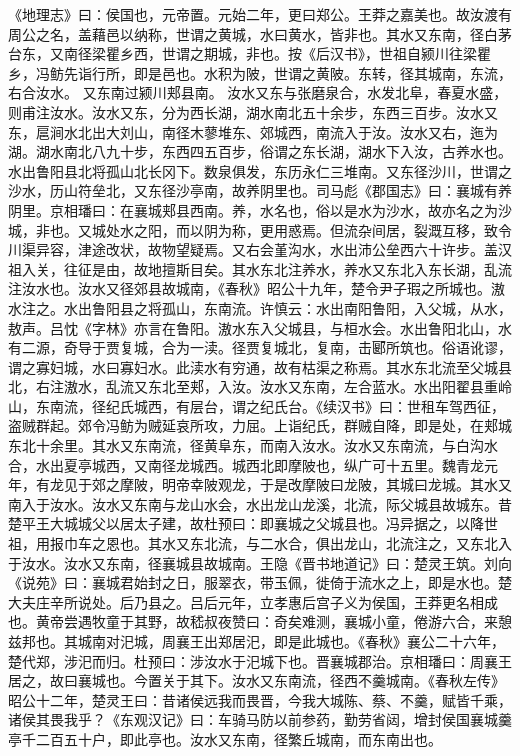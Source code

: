 \documentclass[12pt,UTF8]{ctexbook}
\begin{document}
《地理志》曰：侯国也，元帝置。元始二年，更曰郑公。王莽之嘉美也。故汝渡有周公之名，盖藉邑以纳称，世谓之黄城，水曰黄水，皆非也。其水又东南，径白茅台东，又南径梁瞿乡西，世谓之期城，非也。按《后汉书》，世祖自颍川往梁瞿乡，冯鲂先诣行所，即是邑也。水积为陂，世谓之黄陂。东转，径其城南，东流，右合汝水。
又东南过颍川郏县南。
汝水又东与张磨泉合，水发北阜，春夏水盛，则甫注汝水。汝水又东，分为西长湖，湖水南北五十余步，东西三百步。汝水又东，扈涧水北出大刘山，南径木蓼堆东、郊城西，南流入于汝。汝水又右，迤为湖。湖水南北八九十步，东西四五百步，俗谓之东长湖，湖水下入汝，古养水也。水出鲁阳县北将孤山北长冈下。数泉俱发，东历永仁三堆南。又东径沙川，世谓之沙水，历山符垒北，又东径沙亭南，故养阴里也。司马彪《郡国志》曰：襄城有养阴里。京相璠曰：在襄城郏县西南。养，水名也，俗以是水为沙水，故亦名之为沙城，非也。又城处水之阳，而以阴为称，更用惑焉。但流杂间居，裂溉互移，致令川渠异容，津途改状，故物望疑焉。又右会堇沟水，水出沛公垒西六十许步。盖汉祖入关，往征是由，故地擅斯目矣。其水东北注养水，养水又东北入东长湖，乱流注汝水也。汝水又径郊县故城南，《春秋》昭公十九年，楚令尹子瑕之所城也。滶水注之。水出鲁阳县之将孤山，东南流。许慎云：水出南阳鲁阳，入父城，从水，敖声。吕忱《字林》亦言在鲁阳。滶水东入父城县，与桓水会。水出鲁阳北山，水有二源，奇导于贾复城，合为一渎。径贾复城北，复南，击郾所筑也。俗语讹谬，谓之寡妇城，水曰寡妇水。此渎水有穷通，故有枯渠之称焉。其水东北流至父城县北，右注滶水，乱流又东北至郏，入汝。汝水又东南，左合蓝水。水出阳翟县重岭山，东南流，径纪氏城西，有层台，谓之纪氏台。《续汉书》曰：世租车驾西征，盗贼群起。郊令冯鲂为贼延哀所攻，力屈。上诣纪氏，群贼自降，即是处，在郏城东北十余里。其水又东南流，径黄阜东，而南入汝水。汝水又东南流，与白沟水合，水出夏亭城西，又南径龙城西。城西北即摩陂也，纵广可十五里。魏青龙元年，有龙见于郊之摩陂，明帝幸陂观龙，于是改摩陂曰龙陂，其城曰龙城。其水又南入于汝水。汝水又东南与龙山水会，水出龙山龙溪，北流，际父城县故城东。昔楚平王大城城父以居太子建，故杜预曰：即襄城之父城县也。冯异据之，以降世祖，用报巾车之恩也。其水又东北流，与二水合，俱出龙山，北流注之，又东北入于汝水。汝水又东南，径襄城县故城南。王隐《晋书地道记》曰：楚灵王筑。刘向《说苑》曰：襄城君始封之日，服翠衣，带玉佩，徙倚于流水之上，即是水也。楚大夫庄辛所说处。后乃县之。吕后元年，立孝惠后宫子义为侯国，王莽更名相成也。黄帝尝遇牧童于其野，故嵇叔夜赞曰：奇矣难测，襄城小童，倦游六合，来憩兹邦也。其城南对汜城，周襄王出郑居汜，即是此城也。《春秋》襄公二十六年，楚代郑，涉汜而归。杜预曰：涉汝水于汜城下也。晋襄城郡治。京相璠曰：周襄王居之，故曰襄城也。今置关于其下。汝水又东南流，径西不羹城南。《春秋左传》昭公十二年，楚灵王曰：昔诸侯远我而畏晋，今我大城陈、蔡、不羹，赋皆千乘，诸侯其畏我乎？《东观汉记》曰：车骑马防以前参药，勤劳省闼，增封侯国襄城羹亭千二百五十户，即此亭也。汝水又东南，径繁丘城南，而东南出也。
\end{document}
